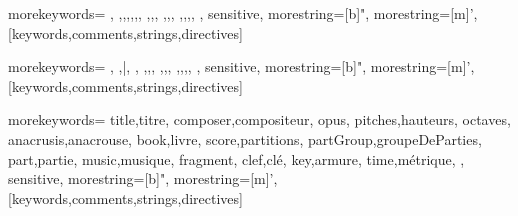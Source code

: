 


%
  {%
  morekeywords={%
  	\version,%
  	\header,\paper,\score,\book,\layout,\midi,%
		\new,\context,\with,%
		\absolute,\relative,\fixed,%
		\language,\clef,\key,\time,%
	},%
  sensitive,%
  morestring=[b]",%
  morestring=[m]', %
}[keywords,comments,strings,directives]%





%
  {%
  morekeywords={%
  	\staff,%
		\barFormat,\bar,%
  	\beamsOff,%
		\new,\context,\with,%
		\absolute,\relative,\fixed,%
		\language,\clef,\key,\time,%
	},%
  sensitive,%
  morestring=[b]",%
  morestring=[m]', %
}[keywords,comments,strings,directives]%





%
  {%
  morekeywords={%
  	title,titre,%
		composer,compositeur,%
		opus,%
  	pitches,hauteurs,%
		octaves,%
		anacrusis,anacrouse,%
		book,livre,%
		score,partitions,%
		partGroup,groupeDeParties,%
		part,partie,%
  	music,musique,%
		fragment,%
		clef,clé,%
		key,armure,%
		time,métrique,%
	},%
  sensitive,%
  morestring=[b]",%
  morestring=[m]', %
}[keywords,comments,strings,directives]%





